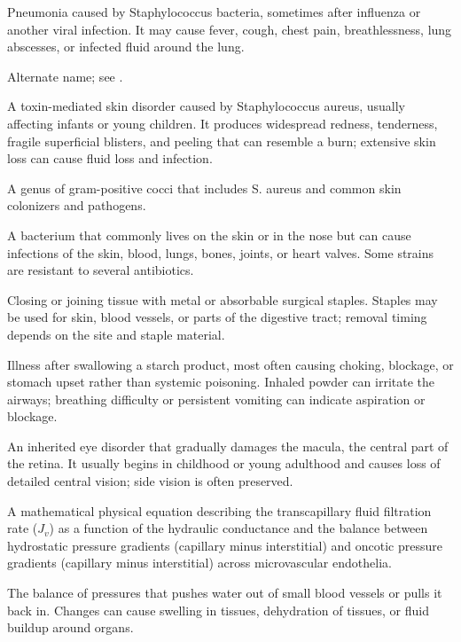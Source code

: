  Pneumonia caused by Staphylococcus bacteria, sometimes after influenza or another viral infection. It may cause fever, cough, chest pain, breathlessness, lung abscesses, or infected fluid around the lung.

 Alternate name; see .

 A toxin-mediated skin disorder caused by Staphylococcus aureus, usually affecting infants or young children. It produces widespread redness, tenderness, fragile superficial blisters, and peeling that can resemble a burn; extensive skin loss can cause fluid loss and infection.

 A genus of gram-positive cocci that includes S. aureus and common skin colonizers and pathogens.

 A bacterium that commonly lives on the skin or in the nose but can cause infections of the skin, blood, lungs, bones, joints, or heart valves. Some strains are resistant to several antibiotics.

 Closing or joining tissue with metal or absorbable surgical staples. Staples may be used for skin, blood vessels, or parts of the digestive tract; removal timing depends on the site and staple material.

 Illness after swallowing a starch product, most often causing choking, blockage, or stomach upset rather than systemic poisoning. Inhaled powder can irritate the airways; breathing difficulty or persistent vomiting can indicate aspiration or blockage.

 An inherited eye disorder that gradually damages the macula, the central part of the retina. It usually begins in childhood or young adulthood and causes loss of detailed central vision; side vision is often preserved.

 A mathematical physical equation describing the transcapillary fluid filtration rate ($J_v$) as a function of the hydraulic conductance and the balance between hydrostatic pressure gradients (capillary minus interstitial) and oncotic pressure gradients (capillary minus interstitial) across microvascular endothelia.

 The balance of pressures that pushes water out of small blood vessels or pulls it back in. Changes can cause swelling in tissues, dehydration of tissues, or fluid buildup around organs.

